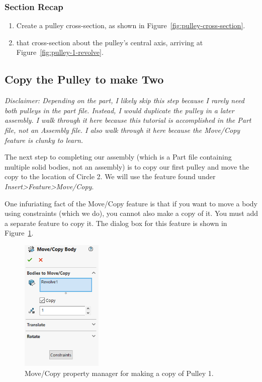 \subsubsection{Section Recap}

\begin{enumerate}
\item{} Create a pulley cross-section, as shown in Figure~\ref{fig:pulley-cross-section}.
\item{}  that cross-section about the pulley's central axis, arriving at
Figure~\ref{fig:pulley-1-revolve}.
\end{enumerate}

\subsection{Copy the Pulley to make Two}

\label{sec:copy_the_pulley}

\emph{Disclaimer: Depending on the part, I likely skip this step because I rarely
need both pulleys in the part file. Instead, I would duplicate the pulley in a
later assembly. I walk through it here because this tutorial is
accomplished in the Part file, not an Assembly file. I also walk through it here
because the Move/Copy feature is clunky to learn.}

\hfill\break

The next step to completing our assembly (which is a Part file containing
multiple solid bodies, not an assembly) is to copy our first pulley and move the copy to the
location of Circle 2. We will use the  feature found under
\emph{Insert\textgreater{}Feature\textgreater{}Move/Copy}.

One infuriating fact of the Move/Copy feature is that if
you want to move a body using constraints (which we do), you cannot also make a
copy of it. You must add a separate feature to copy it. The dialog box for this
feature is shown in Figure~\ref{fig:copy-pulley-1}.

\begin{figure}[H]
\begin{center}
  \includegraphics[height=2.5in]{images/figures/copy-pulley-1.png}
\end{center}
\caption{Move/Copy property manager for making a copy of Pulley 1.
\label{fig:copy-pulley-1}}

\end{figure}

